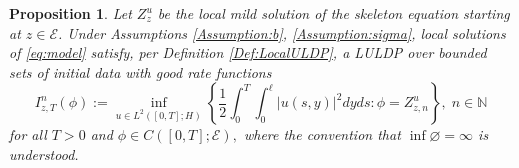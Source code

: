 \documentclass[10pt, reqno]{amsart}
\newcommand{\N}{\mathbb{N}}
\newcommand{\e}{\mathcal{E}}
\newtheorem{prop}{Proposition}
\theoremstyle{definition}
\numberwithin{lem}{section}
\numberwithin{cor}{section}
\numberwithin{prop}{section}
\numberwithin{thm}{section}
\numberwithin{dfn}{section}
\begin{document}
    \begin{prop}\label{prop:LULDP} Let %
    $Z_z^u$ be the local mild solution of the skeleton equation starting at $z\in\e$. Under Assumptions \ref{Assumption:b}, \ref{Assumption:sigma}, local solutions of \eqref{eq:model} satisfy, per Definition \ref{Def:LocalULDP}, a LULDP over bounded sets of initial data with good rate functions             \begin{equation}\label{eq:LRateFunctionWave}
             I^n_{z,T}(\phi) := \inf_{u\in L^2([0,T];H)} \left\{ \frac{1}{2}\int_0^T \int_0^\ell |u(s,y)|^2 dyds: \phi=Z^{u}_{z,n}  \right\},\;n\in\N
         \end{equation}
          for all $T>0$ and $\phi\in C([0,T];\e),$ where the convention that $\inf\varnothing=\infty$ is understood.
    \end{prop}

              
             
\end{document}
